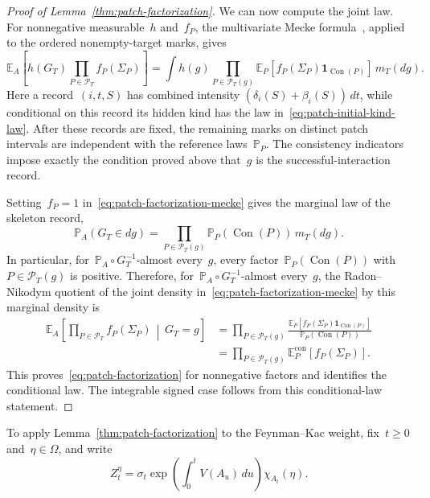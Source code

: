 \documentclass[EJP,preprint,NODS,nobera]{ejpecp}
\newcommand{\pP}{\mathbb{P}}
\newcommand{\E}{\mathbb{E}}
\newcommand{\bb}[1]{\left(#1\right)}
\newcommand{\Cb}[1]{\left[#1\right]}
\newcommand{\ind}{\mathbf{1}}
\newcommand{\chg}[1]{{\color{changegreen}#1}}
\begin{document}
\begin{proof}[Proof of Lemma~\ref{thm:patch-factorization}]
We can now compute the joint law. For nonnegative measurable~$h$ and~$f_P$, the
multivariate Mecke formula~\cite[Theorem~4.4]{LastPenrose2017}, applied to the
ordered nonempty-target marks, gives
\begin{equation}
\label{eq:patch-factorization-mecke}
\E_A\Cb{
h(G_T)
\prod_{P\in\mathcal P_T}f_P\bb{\Sigma_P}
}
=
\int h(g)
\prod_{P\in\mathcal P_T(g)}
\E_P\Cb{
f_P\bb{\Sigma_P}\ind_{\operatorname{Con}(P)}
}
\,m_T(dg).
\end{equation}
Here a record~$(i,t,S)$ has combined intensity
$\bb{\delta_i(S)+\beta_i(S)}\,dt$, while conditional on this record its
hidden kind has the law in~\eqref{eq:patch-initial-kind-law}. After these
records are fixed, the remaining marks on distinct patch intervals are
independent with the reference laws~$\pP_P$. The consistency indicators impose
exactly the condition proved above that~$g$ is the successful-interaction
record.

Setting~$f_P=1$ in~\eqref{eq:patch-factorization-mecke} gives the marginal law
of the skeleton record,
\begin{equation*}
\pP_A\bb{G_T\in dg}
=
\prod_{P\in\mathcal P_T(g)}
\pP_P\bb{\operatorname{Con}(P)}
\,m_T(dg).
\end{equation*}
\chg{In particular, for~$\pP_A\circ G_T^{-1}$-almost every~$g$, every
factor~$\pP_P\bb{\operatorname{Con}(P)}$ with~$P\in\mathcal P_T(g)$ is
positive.} Therefore, for~$\pP_A\circ G_T^{-1}$-almost every~$g$, the Radon--Nikodym
quotient of the joint density in~\eqref{eq:patch-factorization-mecke} by this
marginal density is
\begin{align*}
\E_A\Cb{
\prod_{P\in\mathcal P_T}f_P\bb{\Sigma_P}
\,\middle|\,G_T=g
}
&=
\prod_{P\in\mathcal P_T(g)}
\frac{
\E_P\Cb{f_P\bb{\Sigma_P}\ind_{\operatorname{Con}(P)}}
}{
\pP_P\bb{\operatorname{Con}(P)}
}
\\
&=
\prod_{P\in\mathcal P_T(g)}
\E_P^{\mathrm{con}}\Cb{f_P\bb{\Sigma_P}}.
\end{align*}
This proves~\eqref{eq:patch-factorization} for nonnegative factors and
identifies the conditional law. The integrable signed case follows from this
conditional-law statement.
\end{proof}

\chg{To apply Lemma~\ref{thm:patch-factorization} to the Feynman--Kac weight,
fix~$t\geq0$ and~$\eta\in\Omega$, and write}
\begin{equation*}
Z_t^\eta
=
\sigma_t
\exp\bb{\int_0^tV(A_u)\,du}
\chi_{A_t}(\eta).
\end{equation*}
\end{document}
